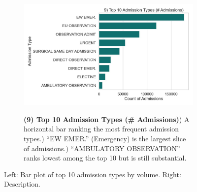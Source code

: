 \documentclass[12pt,a4paper]{report}
\begin{document}
\begin{figure}[ht!]
    \centering
    \begin{subfigure}{0.42\textwidth}
        \includegraphics[width=\linewidth]{mimic_plots/plot9.jpg}
    \end{subfigure}\hfill
    \begin{subfigure}{0.54\textwidth}
        \footnotesize
        \textbf{(9) Top 10 Admission Types (\# Admissions)}) A horizontal bar ranking the most frequent admission types.) “EW EMER.” (Emergency) is the largest slice of admissions.) “AMBULATORY OBSERVATION” ranks lowest among the top 10 but is still substantial.
    \end{subfigure}
    \caption{Left: Bar plot of top 10 admission types by volume. Right: Description.}
    \label{fig:plot9}
\end{figure}
\end{document}
